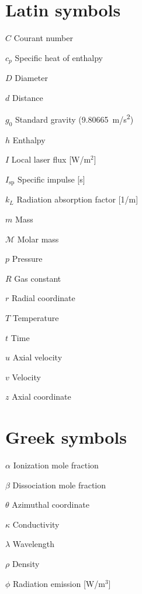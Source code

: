 \begin{multicols*}{2}
    \section*{Latin symbols}
    \begin{nomlist}
        \item[$C$]             Courant number
        \item[$c_p$]           Specific heat of enthalpy
        \item[$D$]             Diameter
        \item[$d$]             Distance
        \item[$g_0$]           Standard gravity (9.80665~\unit{m/s^2}) 
        \item[$h$          ]   Enthalpy
        \item[$I$          ]   Local laser flux [W/m$^2$]
        \item[$I_\text{sp}$]   Specific impulse [s]
        \item[$k_L$        ]   Radiation absorption factor [1/m]
        \item[$m$]             Mass
        \item[$\mathcal{M}$]   Molar mass
        \item[$p$          ]   Pressure
        \item[$R$]             Gas constant
        \item[$r$          ]   Radial coordinate
        \item[$T$          ]   Temperature
        \item[$t$          ]   Time
        \item[$u$          ]   Axial velocity
        \item[$v$]             Velocity 
        \item[$z$          ]   Axial coordinate
    \end{nomlist}

    \section*{Greek symbols}
    \begin{nomlist}
        \item[$\alpha$]    Ionization mole fraction
        \item[$\beta$]     Dissociation mole fraction
        \item[$\theta$]    Azimuthal coordinate
        \item[$\kappa$]    Conductivity
        \item[$\lambda$]   Wavelength
        \item[$\rho$  ]    Density
        \item[$\phi$  ]    Radiation emission [W/m$^3$]
    \end{nomlist}


\end{multicols*}

